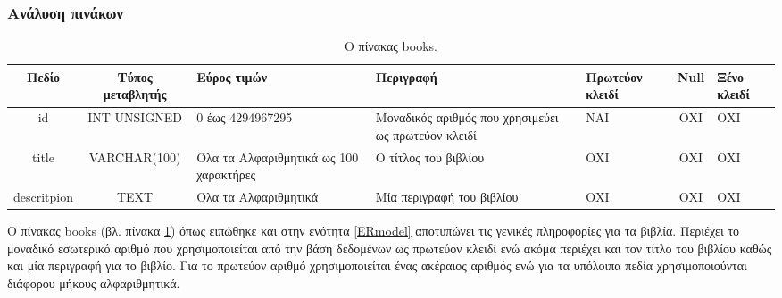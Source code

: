 \documentclass{assignment}
\begin{document}
\begin{landscape}
\subsubsection{Ανάλυση πινάκων}
\label{table_analysis}

\begin{table}[htbp]
\begin{center}
  \begin{tabular}{|c|c|m{}|m{}|m{2.0cm}|c|m{1.5cm}|}
    \hline
    {\bf Πεδίο} & {\bf Τύπος μεταβλητής} & {\bf Εύρος τιμών} & {\bf Περιγραφή} & {\bf Πρωτεύον κλειδί} & {\bf Null} & {\bf Ξένο κλειδί} \\ \hline
    id & INT UNSIGNED & 0 έως 4294967295 & Μοναδικός αριθμός που χρησιμεύει ως πρωτεύον κλειδί & ΝΑΙ & ΟΧΙ & ΟΧΙ \\ \hline
    title & VARCHAR(100) & Όλα τα Αλφαριθμητικά ως 100 χαρακτήρες & Ο τίτλος του βιβλίου & ΟΧΙ & ΟΧΙ & ΟΧΙ \\ \hline
    descritpion & TEXT & Όλα τα Αλφαριθμητικά & Μία περιγραφή του βιβλίου & ΟΧΙ & ΟΧΙ & ΟΧΙ \\ \hline
  \end{tabular}
\caption{Ο πίνακας books.}
\label{table:db_table:books}
\end{center}
\end{table}

Ο πίνακας books (βλ. πίνακα \ref{table:db_table:books}) όπως ειπώθηκε και στην ενότητα \ref{ERmodel} αποτυπώνει τις γενικές πληροφορίες για τα βιβλία. Περιέχει το μοναδικό εσωτερικό αριθμό που χρησιμοποιείται από την βάση δεδομένων ως πρωτεύον κλειδί ενώ ακόμα περιέχει και τον τίτλο του βιβλίου καθώς και μία περιγραφή για το βιβλίο. Για το πρωτεύον αριθμό χρησιμοποιείται ένας ακέραιος αριθμός ενώ για τα υπόλοιπα πεδία χρησιμοποιούνται διάφορου μήκους αλφαριθμητικά. 
\end{landscape}
\end{document}
